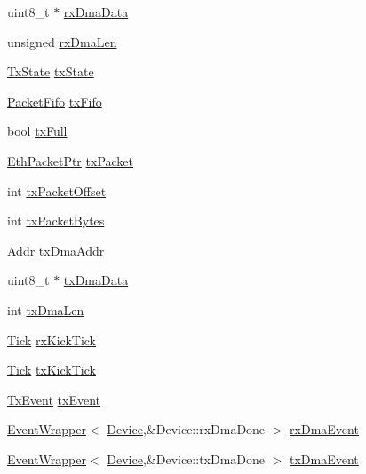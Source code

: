 \begin{DoxyCompactItemize}
\item 
uint8\_\-t $\ast$ \hyperlink{classSinic_1_1Device_ae917f4bc2a610fed06749a854fb89d14}{rxDmaData}
\item 
unsigned \hyperlink{classSinic_1_1Device_a0efc207ddfcff656cbe0237c3bc237c1}{rxDmaLen}
\item 
\hyperlink{classSinic_1_1Device_a96f29317c7f6628ea6a0c1bc5ab05d6a}{TxState} \hyperlink{classSinic_1_1Device_a12e3a80bef638cd15c067541b96a4756}{txState}
\item 
\hyperlink{classPacketFifo}{PacketFifo} \hyperlink{classSinic_1_1Device_ae699c324753236e0a59aa2465920eb46}{txFifo}
\item 
bool \hyperlink{classSinic_1_1Device_aa09cc8a4752916111328b7353e64f3bb}{txFull}
\item 
\hyperlink{classRefCountingPtr}{EthPacketPtr} \hyperlink{classSinic_1_1Device_a8d22e1a154942ff0d4ab9048e7e844bb}{txPacket}
\item 
int \hyperlink{classSinic_1_1Device_ac0d074adcc00053882737a0009c84adb}{txPacketOffset}
\item 
int \hyperlink{classSinic_1_1Device_a1e82240f06ef6f0c8d8c0bb1a141a600}{txPacketBytes}
\item 
\hyperlink{base_2types_8hh_af1bb03d6a4ee096394a6749f0a169232}{Addr} \hyperlink{classSinic_1_1Device_aef3a8dd866e8017fd7a675414596ec6b}{txDmaAddr}
\item 
uint8\_\-t $\ast$ \hyperlink{classSinic_1_1Device_af56464970a8957faf3a1d35026db6a12}{txDmaData}
\item 
int \hyperlink{classSinic_1_1Device_a5782be4cae30f9377ab0c645a9f65892}{txDmaLen}
\item 
\hyperlink{base_2types_8hh_a5c8ed81b7d238c9083e1037ba6d61643}{Tick} \hyperlink{classSinic_1_1Device_aa36d466a86f77d2c7afdc014e3a6f8b3}{rxKickTick}
\item 
\hyperlink{base_2types_8hh_a5c8ed81b7d238c9083e1037ba6d61643}{Tick} \hyperlink{classSinic_1_1Device_acfce4fae6fa03f94e3d91d71302fe349}{txKickTick}
\item 
\hyperlink{classEventWrapper}{TxEvent} \hyperlink{classSinic_1_1Device_a324fed072a29716c20a98a82927bd2a2}{txEvent}
\item 
\hyperlink{classEventWrapper}{EventWrapper}$<$ \hyperlink{classSinic_1_1Device}{Device},\&Device::rxDmaDone $>$ \hyperlink{classSinic_1_1Device_a50d4f78a0a458835572bb101383bf692}{rxDmaEvent}
\item 
\hyperlink{classEventWrapper}{EventWrapper}$<$ \hyperlink{classSinic_1_1Device}{Device},\&Device::txDmaDone $>$ \hyperlink{classSinic_1_1Device_a3d31afcc8e7130b3e43e5dc1a0ef0e37}{txDmaEvent}

\end{DoxyCompactItemize}
